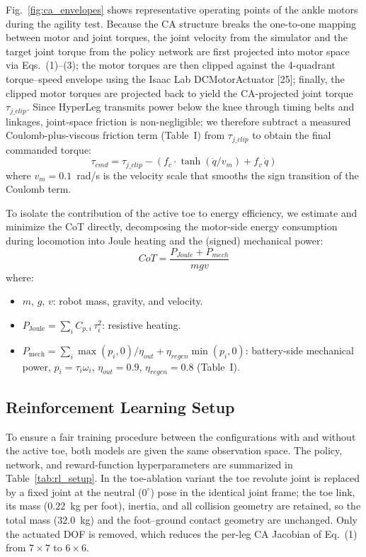 \documentclass[10pt,twocolumn]{ICCAS}
\begin{document}
Fig.~\ref{fig:ca_envelopes} shows representative operating points of the ankle motors during the agility
test. Because the CA structure breaks the one-to-one mapping between motor
and joint torques, the joint velocity from the simulator and the target joint torque from the policy network are
first projected into motor space via Eqs.~(1)--(3); the motor torques are then clipped against the 4-quadrant
torque--speed envelope using the Isaac Lab DCMotorActuator [25]; finally, the clipped motor torques are
projected back to yield the CA-projected joint torque $\tau_{j\_clip}$. Since HyperLeg transmits power below
the knee through timing belts and linkages, joint-space friction is non-negligible; we therefore subtract a
measured Coulomb-plus-viscous friction term (Table~I) from $\tau_{j\_clip}$ to obtain the final commanded
torque:
\begin{equation}
    \tau_{cmd} = \tau_{j\_clip} - \left( f_{c} \cdot \tanh\!\left(\dot{q}/v_{m}\right) + f_{v}\,\dot{q} \right)
    \label{eq:friction}
\end{equation}
where $v_{m} = 0.1$~rad/s is the velocity scale that smooths the sign transition of the Coulomb term.

To isolate the contribution of the active toe to energy efficiency, we estimate and minimize the CoT
directly, decomposing the motor-side energy consumption during locomotion into Joule heating and the
(signed) mechanical power:
\begin{equation}
    CoT = \frac{P_{Joule} + P_{mech}}{mgv}
    \label{eq:cot}
\end{equation}
where:
\begin{itemize}
    \item $m$, $g$, $v$: robot mass, gravity, and velocity.
    \item $P_{\text{Joule}} = \sum_{i} C_{p,i}\,\tau_{i}^{2}$: resistive heating.
    \item $P_{\text{mech}} = \sum_{i} \max(p_{i},0)/\eta_{out} + \eta_{regen}\min(p_{i},0)$:
          battery-side mechanical power, $p_{i} = \tau_{i}\omega_{i}$,
          $\eta_{out} = 0.9$, $\eta_{regen} = 0.8$ (Table~I).
\end{itemize}


\subsection{Reinforcement Learning Setup}
To ensure a fair training procedure between the configurations with and without the active toe,
both models are given the same observation space. The policy, network, and reward-function
hyperparameters are summarized in Table~\ref{tab:rl_setup}. In the toe-ablation variant the toe
revolute joint is replaced by a fixed joint at the neutral ($0^{\circ}$) pose in the identical
joint frame; the toe link, its mass ($0.22$~kg per foot), inertia, and all collision geometry are
retained, so the total mass ($32.0$~kg) and the foot--ground contact geometry are unchanged. Only
the actuated DOF is removed, which reduces the per-leg CA Jacobian of Eq.~(1) from $7\times7$ to
$6\times6$.
\end{document}
